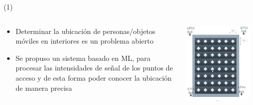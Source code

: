 


\begin{frame}{ \footnotemark (1)}
\begin{columns}
\begin{column}{0.5\textwidth}
		\begin{itemize}
		\item Determinar la ubicación de personas/objetos móviles en interiores es un problema abierto
		\item Se propuso un sistema basado en ML, para procesar las intensidades de señal de los puntos de acceso y de esta forma poder conocer la ubicación de manera precisa
		\end{itemize}
\end{column}
\begin{column}{0.3\textwidth}  
    \begin{center}
     \includegraphics[width=0.85\textwidth]{Figs/IndoorPositionSystem2}
     \end{center}

\end{column}


\end{columns}
\end{frame}
